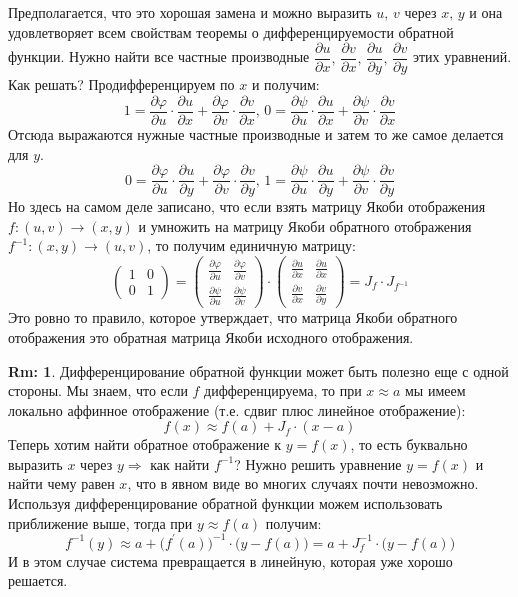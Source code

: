 \documentclass[12pt]{article}
\theoremstyle{definition}
\newtheorem{rem}{Rm:}
\begin{document}
Предполагается, что это хорошая замена и можно выразить $u, \, v$ через $x, \, y$ и она удовлетворяет всем свойствам теоремы о дифференцируемости обратной функции. Нужно найти все частные производные $\dfrac{\partial u}{\partial x}, \, \dfrac{\partial v}{\partial x}, \, \dfrac{\partial u}{\partial y}, \, \dfrac{\partial v}{\partial y}$ этих уравнений. Как решать? Продифференцируем по $x$ и получим:
$$
	1 = \dfrac{\partial \varphi}{\partial u}{\cdot}\dfrac{\partial u}{\partial x} + \dfrac{\partial \varphi}{\partial v}{\cdot}\dfrac{\partial v}{\partial x}, \,
	0 = \dfrac{\partial \psi}{\partial u}{\cdot}\dfrac{\partial u}{\partial x} + \dfrac{\partial \psi}{\partial v}{\cdot}\dfrac{\partial v}{\partial x}
$$
Отсюда выражаются нужные частные производные и затем то же самое делается для $y$. 
$$
	0 = \dfrac{\partial \varphi}{\partial u}{\cdot}\dfrac{\partial u}{\partial y} + \dfrac{\partial \varphi}{\partial v}{\cdot}\dfrac{\partial v}{\partial y}, \,
	1 = \dfrac{\partial \psi}{\partial u}{\cdot}\dfrac{\partial u}{\partial y} + \dfrac{\partial \psi}{\partial v}{\cdot}\dfrac{\partial v}{\partial y}
$$
Но здесь на самом деле записано, что если взять матрицу Якоби отображения $f\colon (u,v) \to (x,y)$ и умножить на матрицу Якоби обратного отображения $f^{-1}\colon (x,y) \to (u,v)$, то получим единичную матрицу:
$$
	\renewcommand\arraystretch{1.2}
	\begin{pmatrix}
		1 & 0 \\
		0 & 1 
	\end{pmatrix} = 
	\begin{pmatrix}
		\tfrac{\partial \varphi}{\partial u} & \tfrac{\partial \varphi}{\partial v}\\
		\tfrac{\partial \psi}{\partial u} & \tfrac{\partial \psi}{\partial v}
	\end{pmatrix}{\cdot}
	\begin{pmatrix}
		\tfrac{\partial u}{\partial x} & \tfrac{\partial u}{\partial x}\\
		\tfrac{\partial v}{\partial x} & \tfrac{\partial v}{\partial y}
	\end{pmatrix} =J_f{\cdot}J_{f^{-1}}
$$
Это ровно то правило, которое утверждает, что матрица Якоби обратного отображения это обратная матрица Якоби исходного отображения.

\begin{rem}
	Дифференцирование обратной функции может быть полезно еще с одной стороны.	Мы знаем, что если $f$ дифференцируема, то при $x \approx a$ мы имеем локально аффинное отображение (т.е. сдвиг плюс линейное отображение):
	$$
		f(x) \approx f(a) + J_f{\cdot}(x-a)
	$$
	Теперь хотим найти обратное отображение к $y = f(x)$, то есть буквально выразить $x$ через $y \Rightarrow$ как найти $f^{-1}$? Нужно решить уравнение $y = f(x)$ и найти чему равен $x$, что в явном виде во многих случаях почти невозможно. Используя дифференцирование обратной функции можем использовать приближение выше, тогда при $y \approx f(a)$ получим:
	$$
		f^{-1}(y) \approx a + \big(f^\prime(a)\big)^{-1}{\cdot}\big(y - f(a)\big) = a + 	J_f^{-1}{\cdot}\big(y - f(a)\big)
	$$
	И в этом случае система превращается в линейную, которая уже хорошо решается.
\end{rem}
\end{document}
